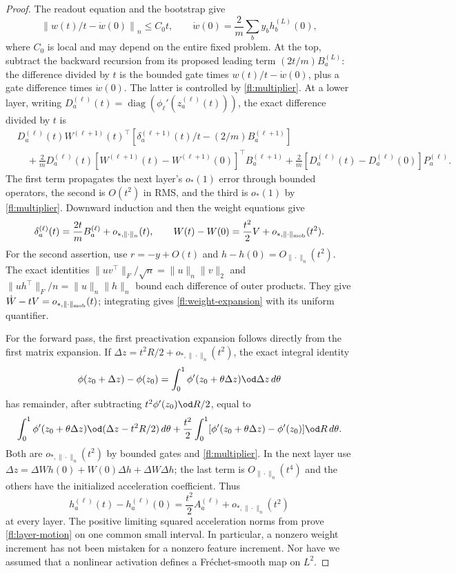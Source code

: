 \begin{proof}
The readout equation and the bootstrap give
\[
 \left\|w(t)/t-\dot w(0)\right\|_n\le C_0t,
 \qquad \dot w(0)=\frac2m\sum_b y_bh_b^{(L)}(0),
\]
where $C_0$ is local and may depend on the entire fixed problem.
At the top, subtract the backward recursion from its proposed leading term
$(2t/m)B_a^{(L)}$: the difference divided by $t$ is the bounded gate
times $w(t)/t-\dot w(0)$, plus a gate difference times $\dot w(0)$.
The latter is controlled by \eqref{fl:multiplier}. At a lower layer,
writing $D_a^{(\ell)}(t)=\operatorname{diag}
(\phi_\ell'(z_a^{(\ell)}(t)))$, the exact difference divided by $t$ is
\begin{align*}
 &D_a^{(\ell)}(t)W^{(\ell+1)}(t)^\top
       [\delta_a^{(\ell+1)}(t)/t-(2/m)B_a^{(\ell+1)}]\\
 &\quad+\frac2mD_a^{(\ell)}(t)
       [W^{(\ell+1)}(t)-W^{(\ell+1)}(0)]^\top B_a^{(\ell+1)}
       +\frac2m[D_a^{(\ell)}(t)-D_a^{(\ell)}(0)]P_a^{(\ell)}.
\end{align*}
The first term propagates the next layer's $o_*(1)$ error through bounded
operators, the second is $O(t^2)$ in RMS, and the third is $o_*(1)$ by
\eqref{fl:multiplier}. Downward induction and then the weight equations give
\begin{equation}
 \delta_a^{(\ell)}(t)=\frac{2t}{m}B_a^{(\ell)}+o_{*,\|\cdot\|_n}(t),
 \qquad
 W(t)-W(0)=\frac{t^2}{2}V+o_{*,\|\cdot\|_{\rm mob}}(t^2).
 \label{fl:weight-expansion}
\end{equation}
For the second assertion, use $r=-y+O(t)$ and $h-h(0)=O_{\|\cdot\|_n}(t^2)$.
The exact identities
$\|uv^\top\|_F/\sqrt n=\|u\|_n\|v\|_2$ and
$\|uh^\top\|_F/n=\|u\|_n\|h\|_n$ bound each difference of outer
products. They give $\dot W-tV=o_{*,\|\cdot\|_{\rm mob}}(t)$;
integrating gives \eqref{fl:weight-expansion} with its uniform quantifier.

For the forward pass, the first preactivation expansion follows directly
from the first matrix expansion. If
$\Delta z=t^2R/2+o_{*,\|\cdot\|_n}(t^2)$, the exact integral identity
\[
 \phi(z_0+\Delta z)-\phi(z_0)
    =\int_0^1\phi'(z_0+\theta\Delta z)\od\Delta z\,d\theta
\]
has remainder, after subtracting $t^2\phi'(z_0)\od R/2$, equal to
\[
 \int_0^1\phi'(z_0+\theta\Delta z)\od(\Delta z-t^2R/2)\,d\theta
 +\frac{t^2}{2}\int_0^1[\phi'(z_0+\theta\Delta z)-\phi'(z_0)]\od R\,d\theta.
\]
Both are $o_{*,\|\cdot\|_n}(t^2)$ by bounded gates and
\eqref{fl:multiplier}. In the next layer use
$\Delta z=\Delta W h(0)+W(0)\Delta h+\Delta W\Delta h$;
the last term is $O_{\|\cdot\|_n}(t^4)$ and the others have the
initialized acceleration coefficient. Thus
\begin{equation}
 h_a^{(\ell)}(t)-h_a^{(\ell)}(0)
    =\frac{t^2}{2}A_a^{(\ell)}+o_{*,\|\cdot\|_n}(t^2)
 \label{fl:feature-expansion}
\end{equation}
at every layer. The positive limiting squared acceleration norms from
 prove \eqref{fl:layer-motion} on one common
small interval. In particular, a nonzero weight increment has not been
mistaken for a nonzero feature increment. Nor have we assumed that a
nonlinear activation defines a Fr\'echet-smooth map on $L^2$.


\end{proof}
